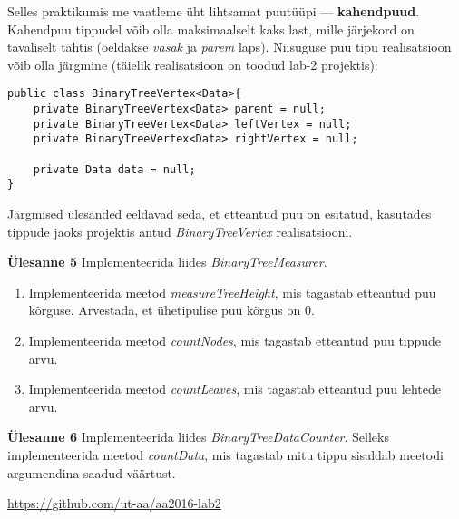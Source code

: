 \documentclass[a4paper]{article}
\begin{document}
Selles praktikumis me vaatleme üht lihtsamat puutüüpi --- \textbf{kahendpuud}. Kahendpuu tippudel võib olla maksimaalselt kaks last, mille järjekord on tavaliselt tähtis (öeldakse \emph{vasak} ja \emph{parem} laps). Niisuguse puu tipu realisatsioon võib olla järgmine (täielik realisatsioon on toodud lab-2 projektis):

\begin{lstlisting}
public class BinaryTreeVertex<Data>{
	private BinaryTreeVertex<Data> parent = null;
	private BinaryTreeVertex<Data> leftVertex = null;
	private BinaryTreeVertex<Data> rightVertex = null;
	
	private Data data = null;
}
\end{lstlisting}

Järgmised ülesanded eeldavad seda, et etteantud puu on esitatud, kasutades tippude jaoks projektis antud \textit{BinaryTreeVertex} realisatsiooni.

\begin{problem}
\textbf{Ülesanne 5}
\newline
Implementeerida liides \textit{BinaryTreeMeasurer}.
\begin{enumerate}
\item
Implementeerida meetod \textit{measureTreeHeight}, mis tagastab etteantud puu kõrguse.
Arvestada, et ühetipulise puu kõrgus on 0.
\item
Implementeerida meetod \textit{countNodes}, mis tagastab etteantud puu tippude arvu.
\item
Implementeerida meetod \textit{countLeaves}, mis tagastab etteantud puu lehtede arvu.
\end{enumerate}
\end{problem}

\begin{problem}
\textbf{Ülesanne 6}
\newline
Implementeerida liides \textit{BinaryTreeDataCounter}. Selleks implementeerida meetod \textit{countData}, mis tagastab mitu tippu sisaldab meetodi argumendina saadud väärtust.
\end{problem}

\url{https://github.com/ut-aa/aa2016-lab2}
\end{document}
